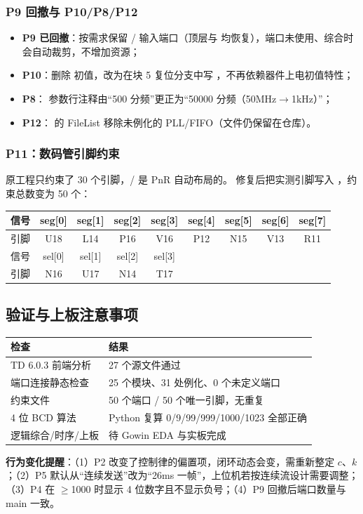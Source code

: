 \subsubsection{P9 回撤与 P10/P8/P12}

\begin{itemize}[leftmargin=2em,itemsep=2pt]
  \item \textbf{P9 已回撤}：按需求保留 / 输入端口（顶层与 
        均恢复），端口未使用、综合时会自动裁剪，不增加资源；
  \item \textbf{P10}：删除  初值，改为在块 5 复位分支中写
        ，不再依赖器件上电初值特性；
  \item \textbf{P8}： 参数行注释由“500 分频”更正为“50000 分频（50MHz$\rightarrow$1kHz）”；
  \item \textbf{P12}： 的 FileList 移除未例化的 PLL/FIFO（文件仍保留在仓库）。
\end{itemize}

\subsubsection{P11：数码管引脚约束}

原工程只约束了 30 个引脚，/ 是 PnR 自动布局的。
修复后把实测引脚写入 ，约束总数变为 50 个：

\begin{table}[htbp]
\centering
\small
\begin{tabular}{lcccccccc}
\toprule
信号 & seg[0] & seg[1] & seg[2] & seg[3] & seg[4] & seg[5] & seg[6] & seg[7]\\
\midrule
引脚 & U18 & L14 & P16 & V16 & P12 & N15 & V13 & R11\\
\midrule
信号 & sel[0] & sel[1] & sel[2] & sel[3] & \multicolumn{4}{c}{}\\
\midrule
引脚 & N16 & U17 & N14 & T17 & \multicolumn{4}{c}{}\\
\bottomrule
\end{tabular}
\end{table}

\subsection{验证与上板注意事项}

\begin{center}
\small
\begin{tabular}{ll}
\toprule
检查 & 结果\\
\midrule
TD 6.0.3 前端分析 & 27 个源文件通过\\
端口连接静态检查 & 25 个模块、31 处例化、0 个未定义端口\\
约束文件 & 50 个端口 / 50 个唯一引脚，无重复\\
4 位 BCD 算法 & Python 复算 0/9/99/999/1000/1023 全部正确\\
逻辑综合/时序/上板 & 待 Gowin EDA 与实板完成\\
\bottomrule
\end{tabular}
\end{center}

\begin{warnbox}
\textbf{行为变化提醒}：（1）P2 改变了控制律的偏置项，闭环动态会变，需重新整定
$c$、$k$；（2）P5 默认从“连续发送”改为“26ms 一帧”，上位机若按连续流设计需要调整；
（3）P4 在 $\ge$1000 时显示 4 位数字且不显示负号；（4）P9 回撤后端口数量与 main 一致。
\end{warnbox}
